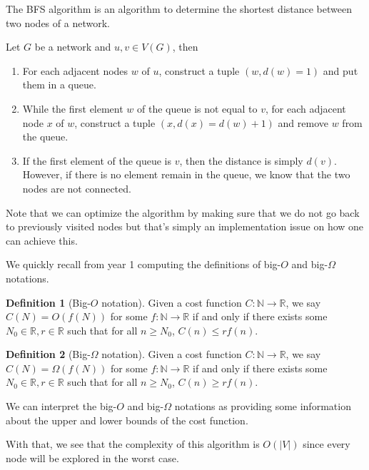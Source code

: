 \documentclass[
]{article}
\theoremstyle{definition}
\theoremstyle{definition}
\newtheorem{definition}{Definition}[section]
\begin{document}
The BFS algorithm is an algorithm to determine the shortest distance
between two nodes of a network.

Let \(G\) be a network and \(u, v \in V(G)\), then

\begin{enumerate}
  \item For each adjacent nodes \(w\) of \(u\), construct a tuple 
    \((w, d(w) = 1)\) and put them in a queue.
  \item While the first element \(w\) of the queue is not equal to \(v\), 
    for each adjacent node \(x\) of \(w\), construct a tuple 
    \((x, d(x) = d(w) + 1)\) and remove \(w\) from the queue.
  \item If the first element of the queue is \(v\), then the distance is simply 
    \(d(v)\). However, if there is no element remain in the queue, we know that 
    the two nodes are not connected.
\end{enumerate}

Note that we can optimize the algorithm by making sure that we do not go
back to previously visited nodes but that's simply an implementation
issue on how one can achieve this.

We quickly recall from year 1 computing the definitions of big-\(O\) and
big-\(\Omega\) notations.

\begin{definition}[Big-\(O\) notation]
  Given a cost function \(C : \mathbb{N} \to \mathbb{R}\), we say 
  \(C(N) = O(f(N))\) for some \(f : \mathbb{N} \to \mathbb{R}\) if and only 
  if there exists some \(N_0 \in \mathbb{R}, r \in \mathbb{R}\) such that 
  for all \(n \ge N_0\), \(C(n) \le rf(n)\).
\end{definition}

\begin{definition}[Big-\(\Omega\) notation]
  Given a cost function \(C : \mathbb{N} \to \mathbb{R}\), we say 
  \(C(N) = \Omega(f(N))\) for some \(f : \mathbb{N} \to \mathbb{R}\) if and only 
  if there exists some \(N_0 \in \mathbb{R}, r \in \mathbb{R}\) such that 
  for all \(n \ge N_0\), \(C(n) \ge rf(n)\).
\end{definition}

We can interpret the big-\(O\) and big-\(\Omega\) notations as providing
some information about the upper and lower bounds of the cost function.

With that, we see that the complexity of this algorithm is
\(O(\left|V\right|)\) since every node will be explored in the worst
case.
\end{document}
